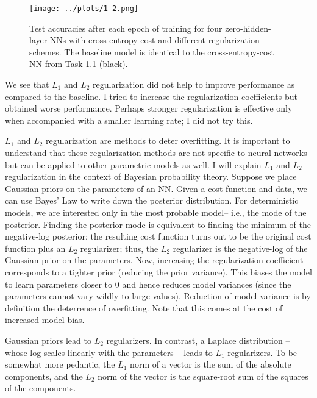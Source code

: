 \documentclass[11pt]{article}
\begin{document}
\begin{figure}
\centering
\texttt{[image: ../plots/1-2.png]}
\caption{\label{fig-1-2} Test accuracies after each epoch of training for four zero-hidden-layer NNs with cross-entropy cost and different regularization schemes. The baseline model is identical to the cross-entropy-cost NN from Task 1.1 (black).}
\end{figure}

We see that $L_1$ and $L_2$ regularization did not help to improve performance as compared to the baseline. I tried to increase the regularization coefficients but obtained worse performance. Perhaps stronger regularization is effective only when accompanied with a smaller learning rate; I did not try this.

$L_1$ and $L_2$ regularization are methods to deter overfitting. It is important to understand that these regularization methods are not specific to neural networks but can be applied to other parametric models as well. I will explain $L_1$ and $L_2$ regularization in the context of Bayesian probability theory. Suppose we place Gaussian priors on the parameters of an NN. Given a cost function and data, we can use Bayes' Law to write down the posterior distribution. For deterministic models, we are interested only in the most probable model-- i.e., the mode of the posterior. Finding the posterior mode is equivalent to finding the minimum of the negative-log posterior; the resulting cost function turns out to be the original cost function plus an $L_2$ regularizer; thus, the $L_2$ regularizer is the negative-log of the Gaussian prior on the parameters. Now, increasing the regularization coefficient corresponds to a tighter prior (reducing the prior variance). This biases the model to learn parameters closer to $0$ and hence reduces model variances (since the parameters cannot vary wildly to large values). Reduction of model variance is by definition the deterrence of overfitting. Note that this comes at the cost of increased model bias.

Gaussian priors lead to $L_2$ regularizers. In contrast, a Laplace distribution -- whose log scales linearly with the parameters -- leads to $L_1$ regularizers. To be somewhat more pedantic, the $L_1$ norm of a vector is the sum of the absolute components, and the $L_2$ norm of the vector is the square-root sum of the squares of the components.
\end{document}
